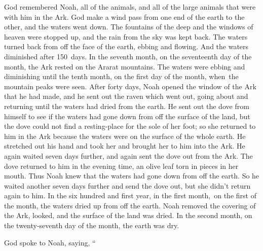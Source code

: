 
\begin{inparaenum}
     God remembered Noah, all of the animals, and all of the large animals that were with him in the Ark. God make a wind pass from one end of the earth to the other, and the waters went down.%
     The fountains of the deep and the windows of heaven were stopped up, and the rain from the sky was kept back.%
     The waters turned back from off the face of the earth, ebbing and flowing. And the waters diminished after 150~days.%
     In the seventh month, on the seventeenth day of the month, the Ark rested on the Ararat mountains.%
     The waters were ebbing and diminishing until the tenth month, on the first day of the month, when\understood\ the mountain peaks were seen.%
     After forty days, Noah opened the window of the Ark that he had made,%
     and he sent out the raven which went out, going about and returning until the waters had dried from the earth.%
     He sent out the dove from himself to see if the waters had gone down from off the surface of the land,%
     but the dove could not find a resting-place for the sole of her foot; so she returned to him in the Ark because the waters were on the surface of the whole earth. He stretched out his hand and took her and brought her to him into the Ark.%
     He again waited seven days further, and again sent the dove out from the Ark.%
     The dove returned to him in the evening time, an olive leaf torn in pieces in her mouth. Thus Noah knew that the waters had gone down from off the earth.%
     So he waited another seven days further and send the dove out, but she didn't return again to him.%
     In the six hundred and first year, in the first month,\understood\ on the first of the month, the waters dried up from off the earth. Noah removed the covering of the Ark, looked, and the surface of the land was dried.%
     In the second month, on the twenty-seventh day of the month, the earth was dry.%
    
     God spoke to Noah, saying,%
     ``%
    
\end{inparaenum}
